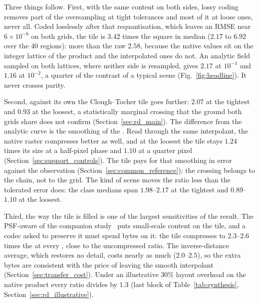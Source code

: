 Three things follow. First, with the same content on both sides, lossy
coding removes part of the oversampling at tight tolerances and most of
it at loose ones, never all. Coded losslessly after that requantisation, which leaves an RMSE near
$6\times10^{-6}$ on both grids, the tile is $3.42$ times the square in median ($2.17$ to $6.92$ over the 40 regions): more than
the raw $2.58$, because the native values sit on the integer lattice of
the product and the interpolated ones do not. An analytic field sampled
on both lattices, where neither side is resampled, gives $2.17$ at
$10^{-4}$ and $1.16$ at $10^{-2}$, a quarter of the contrast of a
typical scene (Fig.~\ref{fig:headline}). It never
crosses parity.

Second, against its own  the Clough--Tocher tile
goes further: $2.07$ at the tightest  and $0.93$ at the
loosest, a statistically marginal crossing that the ground both grids
share does not confirm (Section~\ref{sec:rd_main}). The difference from
the analytic curve is the smoothing of the . Read through
the same interpolant, the native raster compresses better as well, and
at the loosest  the tile stays
$1.24$ times its size at a half-pixel phase and $1.10$ at a
quarter pixel (Section~\ref{sec:support_controls}). The tile pays for
that smoothing in error against the observation
(Section~\ref{sec:common_reference}); the crossing belongs to the chain,
not to the grid. The kind of scene moves the ratio less than the
tolerated error does: the class medians span $1.98$--$2.17$ at
the tightest  and $0.89$--$1.10$ at the loosest.

Third, the way the tile is filled is one of the largest sensitivities
of the result. The PSF-aware  of the companion
study~\cite{delouis2026resample} puts small-scale content on the tile,
and a codec asked to preserve it must spend bytes on it: the tile
compresses to $2.3$--$2.6$ times the  at every
, close to the uncompressed ratio. The inverse-distance
average, which restores no detail, costs nearly as much ($2.0$--$2.5$),
so the extra bytes are consistent with the price of leaving the smooth
interpolant (Section~\ref{sec:transfer_cost}). Under an illustrative
$30\%$ layout overhead on the native product every ratio divides by
$1.3$ (last block of Table~\ref{tab:synthesis},
Section~\ref{sec:rd_illustrative}).
